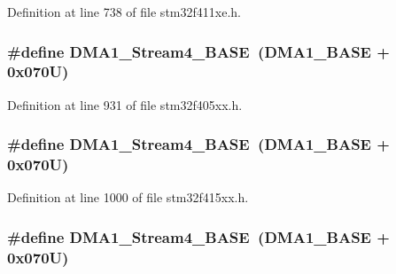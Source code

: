 Definition at line 738 of file stm32f411xe.\+h.

\subsubsection[{\texorpdfstring{D\+M\+A1\+\_\+\+Stream4\+\_\+\+B\+A\+SE}{DMA1_Stream4_BASE}}]{\setlength{\rightskip}{0pt plus 5cm}\#define D\+M\+A1\+\_\+\+Stream4\+\_\+\+B\+A\+SE~({\bf D\+M\+A1\+\_\+\+B\+A\+SE} + 0x070\+U)}\hypertarget{group___peripheral__registers__structures_ga757a3c0d866c0fe68c6176156065a26b}{}\label{group___peripheral__registers__structures_ga757a3c0d866c0fe68c6176156065a26b}


Definition at line 931 of file stm32f405xx.\+h.

\subsubsection[{\texorpdfstring{D\+M\+A1\+\_\+\+Stream4\+\_\+\+B\+A\+SE}{DMA1_Stream4_BASE}}]{\setlength{\rightskip}{0pt plus 5cm}\#define D\+M\+A1\+\_\+\+Stream4\+\_\+\+B\+A\+SE~({\bf D\+M\+A1\+\_\+\+B\+A\+SE} + 0x070\+U)}\hypertarget{group___peripheral__registers__structures_ga757a3c0d866c0fe68c6176156065a26b}{}\label{group___peripheral__registers__structures_ga757a3c0d866c0fe68c6176156065a26b}


Definition at line 1000 of file stm32f415xx.\+h.

\subsubsection[{\texorpdfstring{D\+M\+A1\+\_\+\+Stream4\+\_\+\+B\+A\+SE}{DMA1_Stream4_BASE}}]{\setlength{\rightskip}{0pt plus 5cm}\#define D\+M\+A1\+\_\+\+Stream4\+\_\+\+B\+A\+SE~({\bf D\+M\+A1\+\_\+\+B\+A\+SE} + 0x070\+U)}\hypertarget{group___peripheral__registers__structures_ga757a3c0d866c0fe68c6176156065a26b}{}\label{group___peripheral__registers__structures_ga757a3c0d866c0fe68c6176156065a26b}


